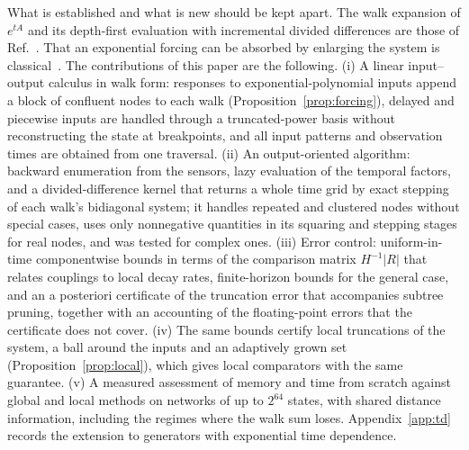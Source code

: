 What is established and what is new should be kept apart. The walk expansion of $e^{tA}$ and its depth-first evaluation with incremental divided differences are those of Ref.~\cite{barash2022}. That an exponential forcing can be absorbed by enlarging the system is classical~\cite{vanloan1978,almohy2011}. The contributions of this paper are the following. (i) A linear input--output calculus in walk form: responses to exponential-polynomial inputs append a block of confluent nodes to each walk (Proposition~\ref{prop:forcing}), delayed and piecewise inputs are handled through a truncated-power basis without reconstructing the state at breakpoints, and all input patterns and observation times are obtained from one traversal. (ii) An output-oriented algorithm: backward enumeration from the sensors, lazy evaluation of the temporal factors, and a divided-difference kernel that returns a whole time grid by exact stepping of each walk's bidiagonal system; it handles repeated and clustered nodes without special cases, uses only nonnegative quantities in its squaring and stepping stages for real nodes, and was tested for complex ones. (iii) Error control: uniform-in-time componentwise bounds in terms of the comparison matrix $H^{-1}|R|$ that relates couplings to local decay rates, finite-horizon bounds for the general case, and an a posteriori certificate of the truncation error that accompanies subtree pruning, together with an accounting of the floating-point errors that the certificate does not cover. (iv) The same bounds certify local truncations of the system, a ball around the inputs and an adaptively grown set (Proposition~\ref{prop:local}), which gives local comparators with the same guarantee. (v) A measured assessment of memory and time from scratch against global and local methods on networks of up to $2^{64}$ states, with shared distance information, including the regimes where the walk sum loses. Appendix~\ref{app:td} records the extension to generators with exponential time dependence.

